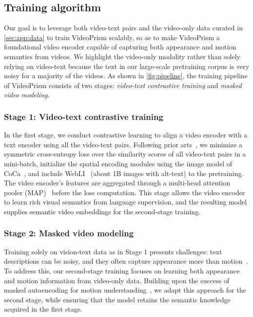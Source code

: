 \documentclass{article}
\theoremstyle{plain}
\theoremstyle{definition}
\theoremstyle{remark}
\newcommand{\OURS}{VideoPrism\xspace}
\begin{document}
\subsection{Training algorithm}
Our goal is to leverage both video-text pairs and the video-only data curated in \cref{sec:app:data}  to train \OURS scalably, so as to make \OURS a foundational video encoder capable of capturing both appearance and motion semantics from videos. We highlight the video-only modality rather than solely relying on video-text because the text in our large-scale pretraining corpus is very noisy for a majority of the videos. As shown in \cref{fig:pipeline}, the training pipeline of \OURS consists of two stages: \emph{video-text contrastive training} and \emph{masked video modeling}.


\subsubsection{Stage 1: Video-text contrastive training}
\label{sec:app:train:teacher}
In the first stage, we conduct contrastive learning to align a video encoder with a text encoder using all the video-text pairs. Following prior arts~\cite{radford2021learning,jia2021scaling,cheng2023vindlu}, we minimize a symmetric cross-entropy loss over the similarity scores of all video-text pairs in a mini-batch, initialize the spatial encoding modules using the image model of CoCa~\cite{yu2022coca}, and include WebLI~\cite{chen2023pali} (about 1B images with alt-text) to the pretraining. The video encoder's features are aggregated through a multi-head attention pooler (MAP)~\cite{lee2019set} before the loss computation. This stage allows the video encoder to learn rich visual semantics from language supervision, and the resulting model supplies semantic video embeddings for the second-stage training. 



\subsubsection{Stage 2: Masked video modeling}\label{sec:app:train:student}



Training solely on vision-text data as in Stage 1 presents challenges: text descriptions can be noisy, and they often capture appearance more than motion~\cite{hendricks2021probing,momeni2023verbs}.
To address this, our second-stage training focuses on learning both appearance and motion information from video-only data.
Building upon the success of masked autoencoding for motion understanding~\cite{wang2022internvideo,wang2023masked}, we adapt this approach for the second stage, while ensuring that the model retains the semantic knowledge acquired in the first stage.
\end{document}
